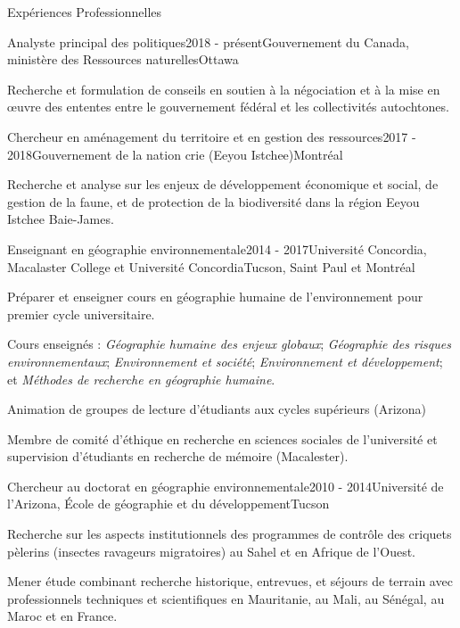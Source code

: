 \documentclass[9pt, letterpage]{resume} %
\begin{document}
\begin{rSection}{Expériences Professionnelles}
  \vspace{0.25em}
\begin{rSubsection}{Analyste principal des politiques}{2018 - présent}{Gouvernement du Canada, ministère des Ressources naturelles}{Ottawa}
\item Recherche et formulation de conseils en soutien à la négociation et à la mise en œuvre des ententes entre le gouvernement fédéral et les collectivités autochtones.
 \end{rSubsection}
 
\begin{rSubsection}{Chercheur en aménagement du territoire et en gestion des ressources}{2017 - 2018}{Gouvernement de la nation crie (Eeyou Istchee)}{Montréal}
\item 
Recherche et analyse sur les enjeux de développement économique et social, de gestion de la faune, et de protection de la biodiversité dans la région Eeyou Istchee Baie-James.
 \end{rSubsection}
 
\begin{rSubsection}{Enseignant en géographie environnementale}{2014 - 2017}{Université Concordia, Macalaster College et Université Concordia}{Tucson, Saint Paul et Montréal}
\item Préparer et enseigner cours en géographie humaine de l'environnement pour premier cycle universitaire.
\item Cours enseignés : \emph{Géographie humaine des enjeux globaux}; \emph{Géographie des risques environnementaux}; \emph{Environnement et société}; \emph{Environnement et développement}; et \emph{Méthodes de recherche en géographie humaine}.
\item Animation de groupes de lecture d'étudiants aux cycles supérieurs (Arizona)  \item Membre de comité d’éthique en recherche en sciences sociales de l’université et supervision d’étudiants en recherche de mémoire (Macalester).	
\end{rSubsection}

\begin{rSubsection}{Chercheur au doctorat en géographie environnementale}{2010 - 2014}{Université de l’Arizona, École de géographie et du développement}{Tucson}
\item Recherche sur les aspects institutionnels des programmes de contrôle des criquets pèlerins (insectes ravageurs migratoires) au Sahel et en Afrique de l’Ouest. 
\item Mener étude combinant recherche historique, entrevues, et séjours de terrain avec professionnels techniques et scientifiques en Mauritanie, au Mali, au Sénégal, au Maroc et en France.
\end{rSubsection}


\end{rSection}
\end{document}
